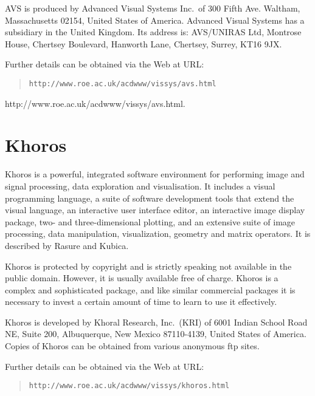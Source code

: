 AVS is produced by Advanced Visual Systems Inc.\ of 300 Fifth Ave.
Waltham, Massachusetts 02154, United States of America. Advanced Visual
Systems has a subsidiary in the United Kingdom. Its address is:
AVS/UNIRAS Ltd, Montrose House, Chertsey Boulevard, Hanworth Lane, 
Chertsey, Surrey, KT16 9JX.

\begin{latexonly}
Further details can be obtained via the Web at URL:

\begin{quote}
{\tt http://www.roe.ac.uk/acdwww/vissys/avs.html}
\end{quote}
\end{latexonly}

\begin{htmlonly}
{http://www.roe.ac.uk/acdwww/vissys/avs.html}.
\end{htmlonly}


\section{Khoros \label{KHOROS}  }

Khoros is a powerful, integrated software environment for performing
image and signal processing, data exploration and visualisation. It
includes a visual programming language, a suite of software development 
tools that extend the visual language, an interactive user interface 
editor, an interactive image display package, two- and three-dimensional
 plotting, and an extensive suite of image processing, data manipulation, 
visualization, geometry and matrix operators. It is described by
Rasure and Kubica\cite{RASURE}.

Khoros is protected by copyright and is strictly speaking not available
in the public domain. However, it is usually available free of charge.
Khoros is a complex and sophisticated package, and like similar
commercial packages it is necessary to invest a certain amount of time
to learn to use it effectively.

Khoros is developed by Khoral Research, Inc.\ (KRI) of 6001 Indian
School Road NE, Suite 200, Albuquerque, New Mexico 87110-4139, United
States of America. Copies of Khoros can be obtained from various anonymous 
ftp sites.

\begin{latexonly}
Further details can be obtained via the Web at URL:

\begin{quote}
{\tt http://www.roe.ac.uk/acdwww/vissys/khoros.html}
\end{quote}
\end{latexonly}

